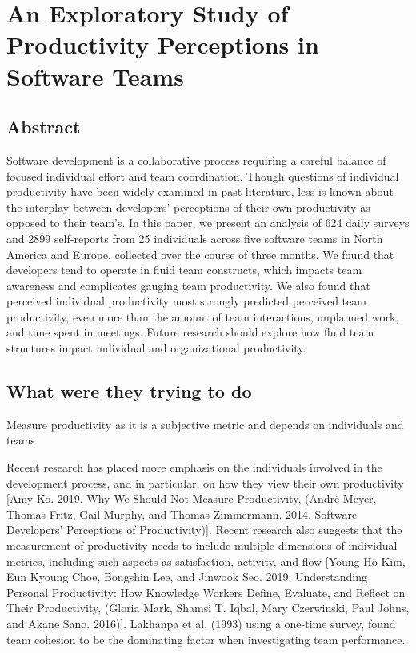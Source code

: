 
\section{An Exploratory Study of Productivity Perceptions in Software Teams}

\subsection{Abstract}

Software development is a collaborative process requiring a careful balance of focused individual
effort and team coordination. Though questions of individual productivity have been widely examined in
past literature, less is known about the interplay between developers’ perceptions of their own productivity
as opposed to their team’s. In this paper, we present an analysis of 624 daily surveys and 2899 self-reports
from 25 individuals across five software teams in North America and Europe, collected over the course
of three months. We found that developers tend to operate in fluid team constructs, which impacts
team awareness and complicates gauging team productivity. We also found that perceived individual
productivity most strongly predicted perceived team productivity, even more than the amount of team
interactions, unplanned work, and time spent in meetings. Future research should explore how fluid team
structures impact individual and organizational productivity.

\subsection{What were they trying to do}

Measure productivity as it is a subjective metric and depends on individuals and teams

Recent research has placed more
emphasis on the individuals involved in the development process, and in particular, on how they view their own productivity [Amy Ko. 2019. Why We Should Not Measure Productivity, (André Meyer, Thomas Fritz, Gail Murphy, and Thomas Zimmermann. 2014. Software Developers’ Perceptions of Productivity)]. Recent research also suggests that the measurement of productivity needs to include multiple dimensions of individual metrics, including such aspects as satisfaction, activity, and flow [Young-Ho Kim, Eun Kyoung Choe, Bongshin Lee, and Jinwook Seo. 2019. Understanding Personal Productivity: How Knowledge Workers Define, Evaluate, and Reflect on Their Productivity, (Gloria Mark, Shamsi T. Iqbal, Mary Czerwinski, Paul Johns, and Akane Sano. 2016)].
Lakhanpa et al. (1993) using a one-time
survey, found team cohesion to be the dominating factor when
investigating team performance.


